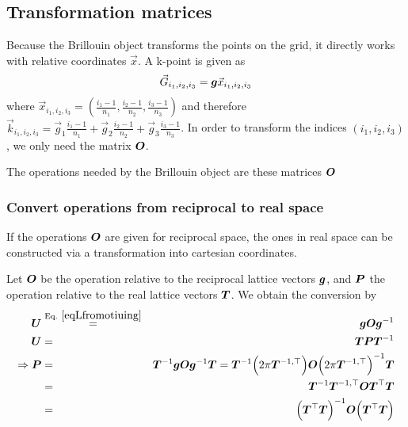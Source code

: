 \documentclass[11pt,a4paper]{report}
\begin{document}
\subsection{Transformation matrices}
Because the Brillouin object transforms the points on the grid, it
directly works with relative coordinates $\vec{x}$. A k-point is given as
\begin{eqnarray}
\vec{G}_{i_1,i_2,i_3}=\bm{g}\vec{x}_{i_1,i_2,i_3}
\end{eqnarray}
where
$\vec{x}_{i_1,i_2,i_3}=(\frac{i_1-1}{n_1},\frac{i_2-1}{n_2},\frac{i_3-1}{n_3})$
and therefore $\vec{k}_{i_1,i_2,i_3}= \vec{g}_1
\frac{i_1-1}{n_1}+\vec{g}_2 \frac{i_2-1}{n_2} +\vec{g}_3\frac{i_3-1}{n_3}$.
In order to transform the indices $(i_1,i_2,i_3)$, we only need the
matrix $\bm{O}$.

The operations needed by the Brillouin object are these matrices
$\bm{O}$

\subsubsection{Convert operations from reciprocal to real space}
If the operations $\bm{O}$ are given for reciprocal space, the ones
in real space can be constructed via a transformation into cartesian
coordinates.

Let $\bm{O}$ be the operation relative to the reciprocal lattice
vectors $\bm{g}$, and $\bm{P}$ the operation relative to the real
lattice vectors $\bm{T}$. We obtain the conversion by
\begin{eqnarray}
\mat{U}&\eqrel{eqLfromotiuing}{=}&\mat{g}\mat{O}\mat{g}^{-1}
\nonumber\\
\mat{U}&=&\mat{T}\mat{P}\mat{T}^{-1}
\nonumber\\
\Rightarrow
\mat{P}
&=&\mat{T}^{-1}\mat{g}\mat{O}\mat{g}^{-1}\mat{T}
=\mat{T}^{-1}\Bigl(2\pi\mat{T}^{-1,\top}\Bigr)
\mat{O}\Bigl(2\pi\mat{T}^{-1,\top}\Bigr)^{-1}\mat{T}
\nonumber\\
&=&\mat{T}^{-1}\mat{T}^{-1,\top}
\mat{O}\mat{T}^{\top}\mat{T}
\nonumber\\ 
&=&\Bigl(\mat{T}^{\top}\mat{T}\Bigr)^{-1}
\mat{O}\Bigl(\mat{T}^{\top}\mat{T}\Bigr)
\label{eq:oppfromo}
\end{eqnarray}
\end{document}
